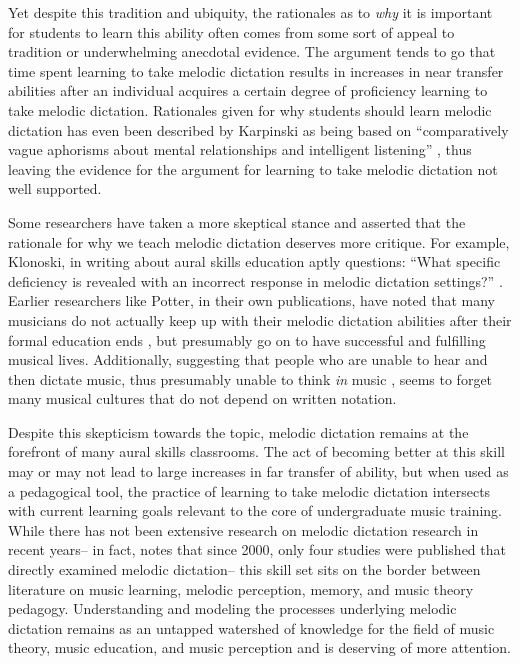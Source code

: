 \documentclass[12pt,]{book}
\begin{document}
Yet despite this tradition and ubiquity, the rationales as to \emph{why} it is important for students to learn this ability often comes from some sort of appeal to tradition or underwhelming anecdotal evidence.
The argument tends to go that time spent learning to take melodic dictation results in increases in near transfer abilities after an individual acquires a certain degree of proficiency learning to take melodic dictation.
Rationales given for why students should learn melodic dictation has even been described by Karpinski as being based on ``comparatively vague aphorisms about mental relationships and intelligent listening'' \citep[p.~192]{karpinskiModelMusicPerception1990}, thus leaving the evidence for the argument for learning to take melodic dictation not well supported.

Some researchers have taken a more skeptical stance and asserted that the rationale for why we teach melodic dictation deserves more critique.
For example, Klonoski, in writing about aural skills education aptly questions: ``What specific deficiency is revealed with an incorrect response in melodic dictation settings?'' \citep{klonoskiImprovingDictationAuralSkills2006}.
Earlier researchers like Potter, in their own publications, have noted that many musicians do not actually keep up with their melodic dictation abilities after their formal education ends \citep{potterIdentifyingSucessfulDictation1990}, but presumably go on to have successful and fulfilling musical lives.
Additionally, suggesting that people who are unable to hear and then dictate music, thus presumably unable to think \emph{in} music \citep{karpinskiAuralSkillsAcquisition2000}, seems to forget many musical cultures that do not depend on written notation.

Despite this skepticism towards the topic, melodic dictation remains at the forefront of many aural skills classrooms.
The act of becoming better at this skill may or may not lead to large increases in far transfer of ability, but when used as a pedagogical tool, the practice of learning to take melodic dictation intersects with current learning goals relevant to the core of undergraduate music training.
While there has not been extensive research on melodic dictation research in recent years-- in fact, \citet{paneyEffectDirectingAttention2016} notes that since 2000, only four studies were published that directly examined melodic dictation-- this skill set sits on the border between literature on music learning, melodic perception, memory, and music theory pedagogy.
Understanding and modeling the processes underlying melodic dictation remains as an untapped watershed of knowledge for the field of music theory, music education, and music perception and is deserving of more attention.
\end{document}
